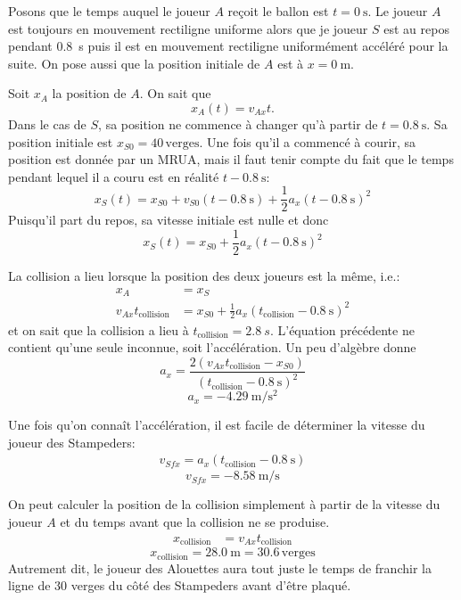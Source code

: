 Posons que le temps auquel le joueur $A$ reçoit le ballon est $t =
\SI{0}{\second}$.  Le joueur $A$ est toujours en mouvement rectiligne uniforme
alors que je joueur $S$ est au repos pendant \SI{0.8}{\second} puis il est en
mouvement rectiligne uniformément accéléré pour la suite.  On pose aussi que la
position initiale de $A$ est à $x = \SI{0}{\meter}$.

Soit $x_A$ la position de $A$. On sait que
\[
  x_A(t) = v_{Ax} t.
\]
Dans le cas de $S$, sa position ne commence à changer qu'à partir de $t =
\SI{0.8}{\second}$.  Sa position initiale est $x_{S0} = 40\, \mathrm{verges}$.
Une fois qu'il a commencé à courir, sa position est donnée par un MRUA, mais il
faut tenir compte du fait que le temps pendant lequel il a couru est en réalité
$t - \SI{0.8}{\second}$:
\[
  x_S(t) = x_{S0} + v_{S0} (t - \SI{0.8}{\second})
           + \frac{1}{2} a_x (t - \SI{0.8}{\second})^2
\]
Puisqu'il part du repos, sa vitesse initiale est nulle et donc
\[
  x_S(t) =  x_{S0} + \frac{1}{2} a_x (t - \SI{0.8}{\second})^2
\]

La collision a lieu lorsque la position des deux joueurs est la même, i.e.:
\begin{align*}
  x_A &= x_S \\
  v_{Ax} t_\mathrm{collision} &= x_{S0} + \frac{1}{2} a_x (t_\mathrm{collision} - \SI{0.8}{\second})^2
\end{align*}
et on sait que la collision a lieu à $t_\mathrm{collision} = \SI{2.8}{s}$.
L'équation précédente ne contient qu'une seule inconnue, soit l'accélération.
Un peu d'algèbre donne
\[
  a_x = \frac{2\left(v_{Ax} t_\mathrm{collision} - x_{S0}\right)}
             {(t_\mathrm{collision} - \SI{0.8}{\second})^2}
\]
\[
  \boxed{a_x = \SI{-4.29}{\meter\per\second\squared}}
\]

Une fois qu'on connaît l'accélération, il est facile de déterminer la vitesse
du joueur des Stampeders:
\begin{align*}
  v_{Sfx} = a_x (t_\mathrm{collision} - \SI{0.8}{\second})
\end{align*}
\[
  \boxed{v_{Sfx} = \SI{-8.58}{\meter\per\second}}
\]

On peut calculer la position de la collision simplement à partir de la vitesse
du joueur $A$ et du temps avant que la collision ne se produise.
\begin{align*}
  x_\mathrm{collision} &= v_{Ax} t_\mathrm{collision}
\end{align*}
\[
  \boxed{x_\mathrm{collision} = \SI{28.0}{\meter} = \num{30.6}\,\mathrm{verges}}
\]
Autrement dit, le joueur des Alouettes aura tout juste le temps de franchir la
ligne de \num{30} verges du côté des Stampeders avant d'être plaqué.


